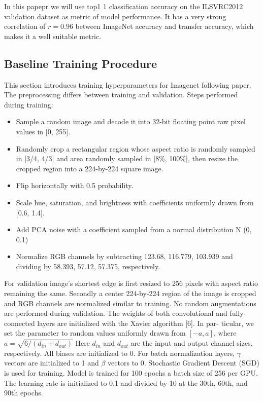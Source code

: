 In this papepr we will use top1 1 classification accuracy on the ILSVRC2012 validation dataset as metric of model performance. It has a very strong correlation of $r=0.96$ \cite{kornblith2019_better} between ImageNet accuracy and transfer accuracy, which makes it a well suitable metric.  

\subsection{Baseline Training Procedure} \label{subsec: baseline_training}
This section introduces training hyperparameters for Imagenet following \cite{he2016identity_resnetv2} paper. The preprocessing differs between training and validation. Steps performed during training:
\begin{itemize}
    \item Sample a random image and decode it into 32-bit floating point raw pixel values in [0, 255].
    \item Randomly crop a rectangular region whose aspect ratio is randomly sampled in [3/4, 4/3] and area randomly sampled in [8\%, 100\%], then resize the cropped region into a 224-by-224 square image.
    \item Flip horizontally with 0.5 probability.
    \item Scale hue, saturation, and brightness with coefficients uniformly drawn from [0.6, 1.4].
    \item Add PCA noise with a coefficient sampled from a normal distribution N (0, 0.1)
    \item Normalize RGB channels by subtracting 123.68, 116.779, 103.939 and dividing by 58.393, 57.12, 57.375, respectively.
\end{itemize}

For validation image's shortest edge is first resized to 256 pixels with aspect ratio remaining the same. Secondly a center 224-by-224 region of the image is cropped and RGB channels are normalized similar to training. No random augmentations are performed during validation. 
The weights of both convolutional and fully-connected layers are initialized with the Xavier algorithm [6]. In par- ticular, we set the parameter to random values uniformly drawn from $[−a, a]$, where $ a = \sqrt{6 / (d_{in} + d_{out})} $ Here $d_{in}$ and $d_{out}$ are the input and output channel sizes, respectively. All biases are initialized to 0. For batch normalization layers, $\gamma$ vectors are initialized to 1 and $\beta$ vectors to 0.
Stochastic Gradient Descent (SGD) is used for training. Model is trained for 100 epochs a batch size of 256 per GPU. The learning rate is initialized to 0.1 and divided by 10 at the 30th, 60th, and 90th epochs. %

